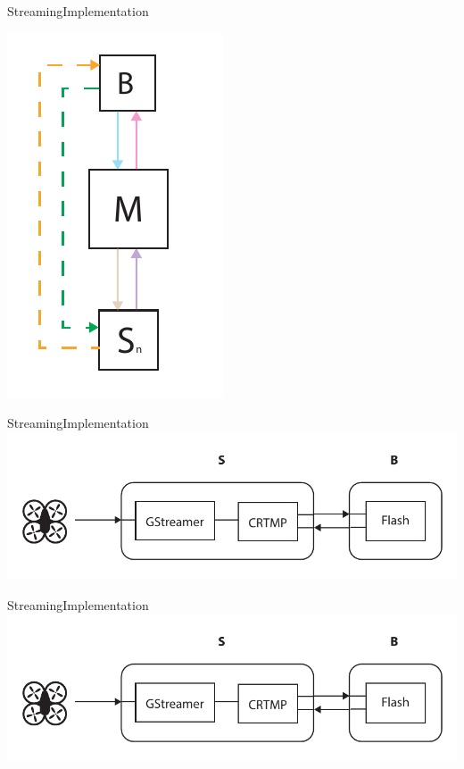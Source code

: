 \begin{frame}{Streaming}{Implementation}
  \begin{center}
    \includegraphics[height=0.7\textheight]{images/dataflow_diagram.pdf}
  \end{center}
\end{frame}

\begin{frame}{Streaming}{Implementation}
  \includegraphics[width=1\textwidth]{images/stream_implementation_overview.pdf}
\end{frame}

\begin{frame}{Streaming}{Implementation}
  \includegraphics[width=1\textwidth]{images/stream_implementation_overview2.pdf}
\end{frame}

